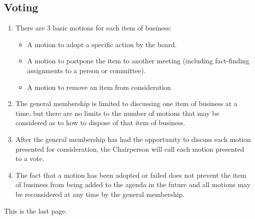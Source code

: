 \documentclass[12pt]{article}
\begin{document}
\subsection{Voting}
\begin{enumerate}[{A.8}.1]
    \item There are 3 basic motions for each item of business:
    \begin{itemize}
        \item	A motion to adopt a specific action by the board.
        \item	A motion to postpone the item to another meeting (including fact-finding assignments to a person or committee).
        \item	A motion to remove an item from consideration 
    \end{itemize}
    \item The general membership is limited to discussing one item of business at a time, but there are no limits to the number of motions that may be considered as to how to dispose of that item of business. 
    \item After the general membership has had the opportunity to discuss each motion presented for consideration, the Chairperson will call each motion presented to a vote. 
    \item The fact that a motion has been adopted or failed does not prevent the item of business from being added to the agenda in the future and all motions may be reconsidered at any time by the general membership. 
\end{enumerate}

\begin{center}
\vfill
{\sc This is the last page.}
\end{center}
\end{document}
